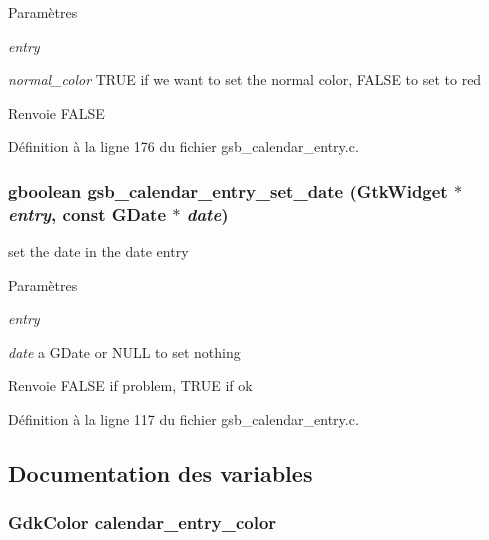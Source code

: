 \begin{DoxyParams}{Paramètres}
\item[{\em entry}]\item[{\em normal\_\-color}]TRUE if we want to set the normal color, FALSE to set to red\end{DoxyParams}
\begin{DoxyReturn}{Renvoie}
FALSE 
\end{DoxyReturn}


Définition à la ligne 176 du fichier gsb\_\-calendar\_\-entry.c.

\subsubsection[{gsb\_\-calendar\_\-entry\_\-set\_\-date}]{\setlength{\rightskip}{0pt plus 5cm}gboolean gsb\_\-calendar\_\-entry\_\-set\_\-date (GtkWidget $\ast$ {\em entry}, \/  const GDate $\ast$ {\em date})}\label{gsb__calendar__entry_8c_af96bec76fa28a05a4ea3355cccb68b96}
set the date in the date entry


\begin{DoxyParams}{Paramètres}
\item[{\em entry}]\item[{\em date}]a GDate or NULL to set nothing\end{DoxyParams}
\begin{DoxyReturn}{Renvoie}
FALSE if problem, TRUE if ok 
\end{DoxyReturn}


Définition à la ligne 117 du fichier gsb\_\-calendar\_\-entry.c.



\subsection{Documentation des variables}
\subsubsection[{calendar\_\-entry\_\-color}]{\setlength{\rightskip}{0pt plus 5cm}GdkColor {\bf calendar\_\-entry\_\-color}}\label{gsb__calendar__entry_8c_aa809fea280ab9cef6e16774b54a573ae}


